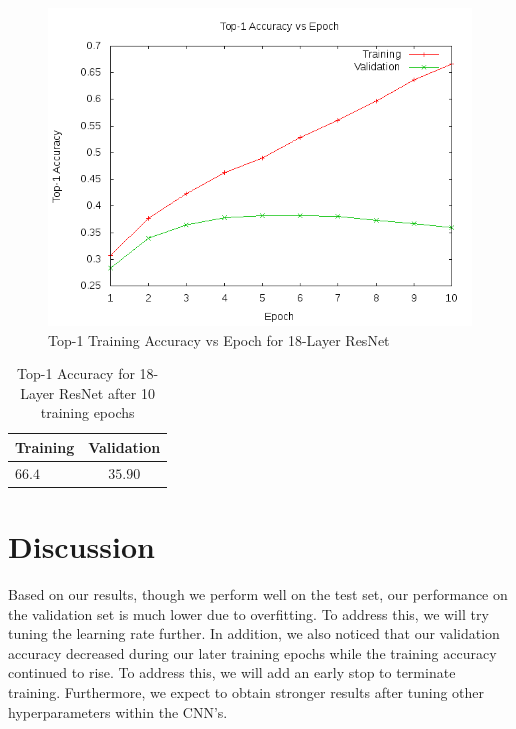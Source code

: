 \documentclass[10pt,twocolumn,letterpaper]{article}
\begin{document}
\begin{figure}[t]
\begin{center}
  \includegraphics[width=0.8\linewidth]{accuracy_resnet18}
\end{center}
   \caption{Top-1 Training Accuracy vs Epoch for 18-Layer ResNet}
\label{fig:top1-resnet18}
\end{figure}

\begin{table}
\begin{center}
\begin{tabular}{|l|c|}
\hline
Training & Validation \\
\hline\hline
$66.4$ & $35.90$\\
\hline
\end{tabular}
\end{center}
\caption{Top-1 Accuracy for 18-Layer ResNet after 10 training epochs}
\label{table:acc18}
\end{table}

\section{Discussion}

Based on our results, though we perform well on the test set, our performance
on the validation set is much lower due to overfitting. To address this, we
will try tuning the learning rate further. In addition, we also noticed that
our validation accuracy decreased during our later training epochs while the
training accuracy continued to rise. To address this, we will add an early stop
to terminate training. Furthermore, we expect to obtain stronger results after tuning other hyperparameters within the CNN's.\\
\end{document}
